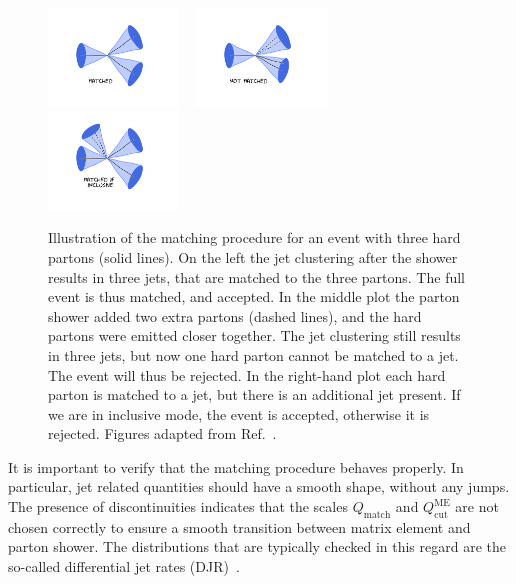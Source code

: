 \begin{figure}[htpb]
  \centering
  \includegraphics[width=0.31\textwidth, clip=true, trim=4cm 3cm 4cm 2cm]
  {figures/eventreco_generation/matching1}
  ~
  \includegraphics[width=0.31\textwidth, clip=true, trim=4cm 3cm 4cm 2cm]
  {figures/eventreco_generation/matching2}
  ~
  \includegraphics[width=0.31\textwidth, clip=true, trim=4cm 3cm 4cm 2cm]
  {figures/eventreco_generation/matching3}
  \caption{Illustration of the matching procedure for an event with three hard partons (solid
lines). On the left the jet clustering after the shower results in three jets, that are matched to
the three partons. The full event is thus matched, and accepted. In the middle plot the parton
shower added two extra partons (dashed lines), and the hard partons were emitted closer together.
The jet clustering still results in three jets, but now one hard parton cannot be matched to a jet.
The event will thus be rejected. In the right-hand plot each hard parton is matched to a jet, but
there is an additional jet present. If we are in inclusive mode, the event is accepted, otherwise
it is rejected.  
  Figures adapted from Ref.~\cite{mlm_plots}. 
  \label{fig:matching}}
\end{figure}


It is important to verify that the matching procedure behaves properly. In particular, jet related
quantities should have a smooth shape, without any jumps. The presence of discontinuities indicates
that the scales $Q_{\mathrm{match}}$ and $Q_{\mathrm{cut}}^{\mathrm{ME}}$ are not chosen
correctly to ensure a smooth transition between matrix element and parton shower. The distributions
that are typically checked in this regard are the so-called differential jet rates
(DJR)~\cite{Alwall:2008qv}. 

